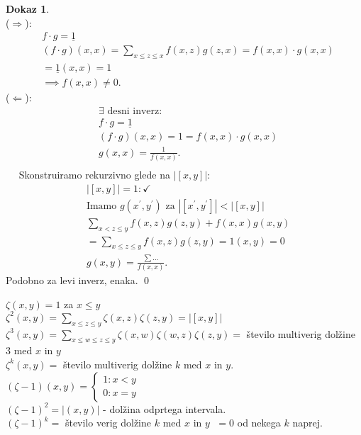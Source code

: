 \documentclass[a4paper, 12pt]{book}
\theoremstyle{definition}
\newtheorem{pro}[counter]{Dokaz}
\theoremstyle{remark}
\begin{document}
\begin{pro} \text{} \\
  ($\Rightarrow$):
  \begin{align*}
    &f \cdot g = \underline{1} \\
    &(f \cdot g)(x,x) = \sum_{x \leq z \leq x} f(x,z) g(z,x) = f(x,x) \cdot g(x,x) \\
    &= \underline{1}(x,x) = 1 \\
    &\implies f(x,x) \neq 0.
  \end{align*}
  ($\Leftarrow$):
  \begin{align*}
    &\exists \text{ desni inverz:} \\
    &f \cdot g = \underline{1} \\
    &(f \cdot g)(x,x) = 1 = f(x,x) \cdot g(x,x) \\
    &g(x,x) = \frac{1}{f(x,x)}. \\
  \end{align*}
  $\quad$ Skonstruiramo rekurzivno glede na $\left|[x,y]\right|$:
  \begin{align*}
    &|[x,y]| = 1: \checkmark \\
    &\text{Imamo } g(x^{'}, y^{'}) \text{ za } |[x^{'}, y^{'}]| < |[x,y]| \\
    &\sum_{x < z \leq y} f(x,z) g(z,y) + f(x,x) g(x,y) \\
    &= \sum_{x \leq z \leq y} f(x,z) g(z,y) = 1(x,y) = 0 \\
    &g(x,y) = \frac{\sum \dots}{f(x,x)}.
  \end{align*}
  Podobno za levi inverz, enaka.
  \qed
\end{pro}
$\zeta(x,y) = 1$ za $x \leq y$ \\
$\zeta^2(x,y) = \sum_{x \leq z \leq y} \zeta(x,z) \zeta(z,y) = \left|[x,y]\right|$ \\
$\zeta^3(x,y) = \sum_{x \leq w \leq z \leq y} \zeta(x,w) \zeta(w,z) \zeta(z,y) =$
število multiverig dolžine $3$ med $x$ in $y$ \\
$\zeta^k(x,y) =$ število multiverig dolžine $k$ med $x$ in $y$. \\
$(\zeta-1)(x,y) = \begin{cases}
  1: x < y \\
  0: x = y
\end{cases}$ \\
$(\zeta-1)^2 = \left|(x,y)\right|$ - dolžina odprtega intervala. \\
$(\zeta-1)^k =$ število verig dolžine $k$ med $x$ in $y \;$ $= 0$ od nekega $k$ naprej. \\
\end{document}

